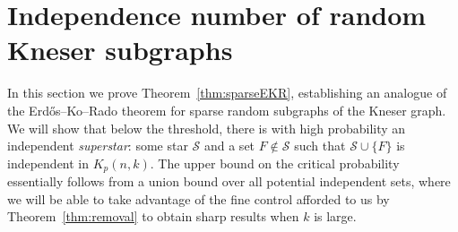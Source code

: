 \documentclass[11pt]{article}
\theoremstyle{definition}
\newcommand{\cS}{\mathcal{S}}
\newcommand{\3}{\bf{3}}
\begin{document}
\section{Independence number of random Kneser subgraphs} \label{sec:kneser}

In this section we prove Theorem~\ref{thm:sparseEKR}, establishing an analogue of the Erd\H{o}s--Ko--Rado theorem for sparse random subgraphs of the Kneser graph.  We will show that below the threshold, there is with high probability an independent \emph{superstar}: some star $\cS$ and a set $F \notin \cS$ such that $\cS \cup \{ F \}$ is independent in $K_p(n,k)$.  The upper bound on the critical probability essentially follows from a union bound over all potential independent sets, where we will be able to take advantage of the fine control afforded to us by Theorem~\ref{thm:removal} to obtain sharp results when $k$ is large.
\end{document}
